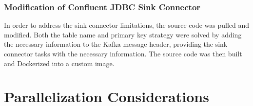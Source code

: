\subsubsection{Modification of Confluent JDBC Sink Connector}
In order to address the sink connector limitations, the source code was pulled and modified. Both the table name and primary key strategy were solved by adding the necessary information to the Kafka message header, providing the sink connector tasks with the necessary information. The source code was then built and Dockerized into a custom image.

\section{Parallelization Considerations}
\label{ch04:pipelinedevelopment:parallelizationconsiderations}
